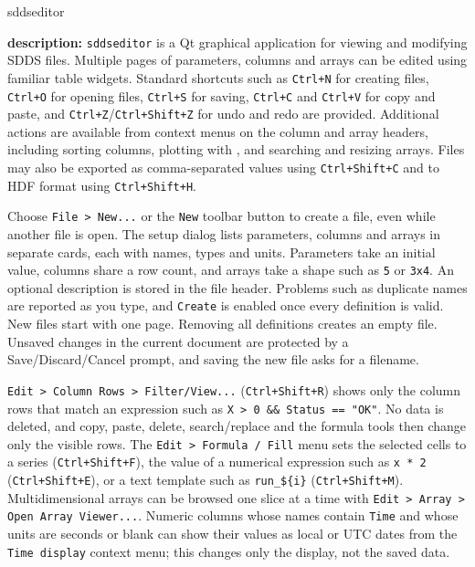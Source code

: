 \begin{sddsprog}{sddseditor}
  \item \textbf{description:} \verb|sddseditor| is a Qt graphical application for viewing
  and modifying SDDS files. Multiple pages of parameters, columns and arrays can be
  edited using familiar table widgets. Standard shortcuts such as
  \verb|Ctrl+N| for creating files, \verb|Ctrl+O| for opening files,
  \verb|Ctrl+S| for saving, \verb|Ctrl+C| and
  \verb|Ctrl+V| for copy and paste, and \verb|Ctrl+Z|/\verb|Ctrl+Shift+Z| for
  undo and redo are provided. Additional actions are available from context menus
  on the column and array headers, including sorting columns, plotting with
  , and searching and resizing arrays. Files may also be
  exported as comma-separated values using \verb|Ctrl+Shift+C| and to HDF format
  using \verb|Ctrl+Shift+H|.

  Choose \verb|File > New...| or the \verb|New| toolbar button to create a file,
  even while another file is open. The setup dialog lists parameters, columns
  and arrays in separate cards, each with names, types and units. Parameters
  take an initial value, columns share a row count, and arrays take a shape such
  as \verb|5| or \verb|3x4|. An optional description is stored in the file
  header. Problems such as duplicate names are reported as you type, and
  \verb|Create| is enabled once every definition is valid. New files start with
  one page. Removing all definitions creates an empty file. Unsaved changes in
  the current document are protected by a Save/Discard/Cancel prompt, and saving
  the new file asks for a filename.

  \verb|Edit > Column Rows > Filter/View...| (\verb|Ctrl+Shift+R|) shows only the
  column rows that match an expression such as \verb|X > 0 && Status == "OK"|. No
  data is deleted, and copy, paste, delete, search/replace and the formula tools
  then change only the visible rows. The \verb|Edit > Formula / Fill| menu sets
  the selected cells to a series (\verb|Ctrl+Shift+F|), the value of a numerical
  expression such as \verb|x * 2| (\verb|Ctrl+Shift+E|), or a text template such
  as \verb|run_${i}| (\verb|Ctrl+Shift+M|). Multidimensional arrays can be browsed
  one slice at a time with \verb|Edit > Array > Open Array Viewer...|. Numeric
  columns whose names contain \verb|Time| and whose units are seconds or blank can
  show their values as local or UTC dates from the \verb|Time display| context
  menu; this changes only the display, not the saved data.


\end{sddsprog}

